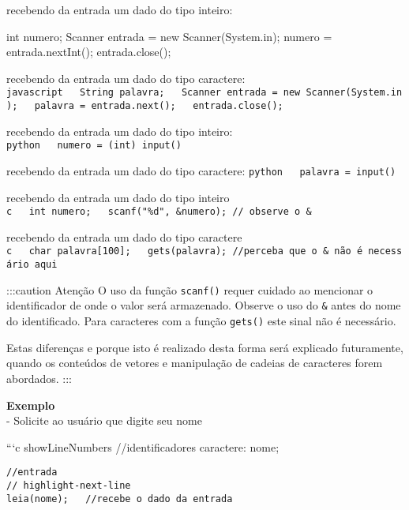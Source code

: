 \documentclass[
  letterpaper,
  DIV=11,
  numbers=noendperiod]{scrreprt}
\newenvironment{Shaded}{\begin{snugshade}}{\end{snugshade}}
\newcommand{\AttributeTok}[1]{\textcolor[rgb]{0.40,0.45,0.13}{#1}}
\newcommand{\FunctionTok}[1]{\textcolor[rgb]{0.28,0.35,0.67}{#1}}
\newcommand{\KeywordTok}[1]{\textcolor[rgb]{0.00,0.23,0.31}{#1}}
\newcommand{\NormalTok}[1]{\textcolor[rgb]{0.00,0.23,0.31}{#1}}
\newcommand{\OperatorTok}[1]{\textcolor[rgb]{0.37,0.37,0.37}{#1}}
\begin{document}
recebendo da entrada um dado do tipo inteiro:

\begin{Shaded}
\begin{Highlighting}[]
\NormalTok{int numero}\OperatorTok{;}
\NormalTok{Scanner entrada }\OperatorTok{=} \KeywordTok{new} \FunctionTok{Scanner}\NormalTok{(System}\OperatorTok{.}\AttributeTok{in}\NormalTok{)}\OperatorTok{;}
\NormalTok{numero }\OperatorTok{=}\NormalTok{ entrada}\OperatorTok{.}\FunctionTok{nextInt}\NormalTok{()}\OperatorTok{;}
\NormalTok{entrada}\OperatorTok{.}\FunctionTok{close}\NormalTok{()}\OperatorTok{;}
\end{Highlighting}
\end{Shaded}

recebendo da entrada um dado do tipo caractere:
\texttt{javascript\ \ \ String\ palavra;\ \ \ Scanner\ entrada\ =\ new\ Scanner(System.in);\ \ \ palavra\ =\ entrada.next();\ \ \ entrada.close();}

recebendo da entrada um dado do tipo inteiro:
\texttt{python\ \ \ numero\ =\ (int)\ input()}

recebendo da entrada um dado do tipo caractere:
\texttt{python\ \ \ palavra\ =\ input()}

recebendo da entrada um dado do tipo inteiro
\texttt{c\ \ \ int\ numero;\ \ \ scanf("\%d",\ \&numero);\ //\ observe\ o\ \&}

recebendo da entrada um dado do tipo caractere
\texttt{c\ \ \ char\ palavra{[}100{]};\ \ \ gets(palavra);\ //perceba\ que\ o\ \&\ não\ é\ necessário\ aqui}

:::caution Atenção O uso da função \texttt{scanf()} requer cuidado ao
mencionar o identificador de onde o valor será armazenado. Observe o uso
do \texttt{\&} antes do nome do identificado. Para caracteres com a
função \texttt{gets()} este sinal não é necessário.

Estas diferenças e porque isto é realizado desta forma será explicado
futuramente, quando os conteúdos de vetores e manipulação de cadeias de
caracteres forem abordados. :::

\textbf{Exemplo}\\
- Solicite ao usuário que digite seu nome

```c showLineNumbers //identificadores caractere: nome;

\begin{verbatim}
//entrada
// highlight-next-line
leia(nome);   //recebe o dado da entrada
\end{verbatim}
\end{document}
